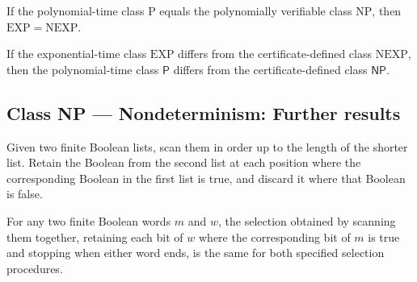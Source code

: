 \begin{theorem}
\label{Complexity.EXP_eq_NEXP_of_P_eq_NP}
\leanok
{}
If the polynomial-time class $\mathrm{P}$ equals the polynomially verifiable class
$\mathrm{NP}$, then $\mathrm{EXP}=\mathrm{NEXP}$.
\end{theorem}

\begin{theorem}
\label{Complexity.P_ne_NP_of_EXP_ne_NEXP}
\leanok
{}
If the exponential-time class $\mathrm{EXP}$ differs from the certificate-defined class
$\mathrm{NEXP}$, then the polynomial-time class $\mathsf{P}$ differs from the
certificate-defined class $\mathsf{NP}$.
\end{theorem}

\subsection*{Class NP --- Nondeterminism: Further results}

\begin{definition}
\label{Complexity.maskSelect}
\leanok
Given two finite Boolean lists, scan them in order up to the length of the shorter list.
Retain the Boolean from the second list at each position where the corresponding Boolean
in the first list is true, and discard it where that Boolean is false.
\end{definition}

\begin{lemma}
\label{Complexity.contSelect_eq_maskSelect}
\leanok
{}
For any two finite Boolean words $m$ and $w$, the selection obtained by scanning them
together, retaining each bit of $w$ where the corresponding bit of $m$ is true and
stopping when either word ends, is the same for both specified selection procedures.
\end{lemma}

